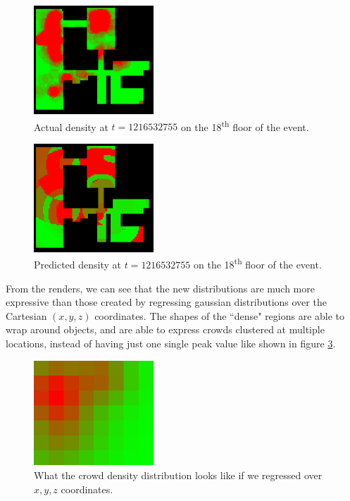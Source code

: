 \documentclass[letterpaper]{article}
\begin{document}
\begin{figure}[h!]
  \centering
    \includegraphics[width=170px]{diagrams/26-27_86-83_59-49_1216532755_actual.png}
  \caption{Actual density at $t=1216532755$ on the 18\textsuperscript{th} floor of the event.}
  \label{fig:t3dist}
\end{figure}

\begin{figure}[h!]
  \centering
    \includegraphics[width=170px]{diagrams/26-27_86-83_59-49_1216532755_predicted.png}
  \caption{Predicted density at $t=1216532755$ on the 18\textsuperscript{th} floor of the event.}
  \label{fig:t4dist}
\end{figure}

From the renders, we can see that the new distributions are much more expressive than those created by regressing gaussian distributions over the Cartesian $(x,y,z)$ coordinates. The shapes of the ``dense" regions are able to wrap around objects, and are able to express crowds clustered at multiple locations, instead of having just one single peak value like shown in figure \ref{fig:xyzdist}.

\begin{figure}[h!]
  \centering
    \includegraphics[width=170px]{diagrams/1_1216440525p.png}
  \caption{What the crowd density distribution looks like if we regressed over $x,y,z$ coordinates.}
  \label{fig:xyzdist}
\end{figure}
\end{document}
